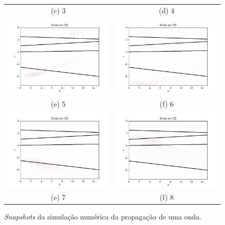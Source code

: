 \begin{figure}[H]
\begin{tabular}{cc}
                        (c) 3 & (d) 4 \\
                        [6pt] \includegraphics[width=65mm]{imagens/FDMimages/Teste012.png} & \includegraphics[width=65mm]{imagens/FDMimages/Teste017.png} \\ 
                        (e) 5 & (f) 6\\
                        [6pt] \includegraphics[width=65mm]{imagens/FDMimages/Teste023.png} & 
                        \includegraphics[width=65mm]{imagens/FDMimages/Teste030.png}\\
                        (e) 7 & (f) 8
                    \end{tabular}
                    \caption{\textit{Snapshots} da simulação numérica da propagação de uma onda.}
                    \label{snapsMDFAbs}
                \end{figure}

